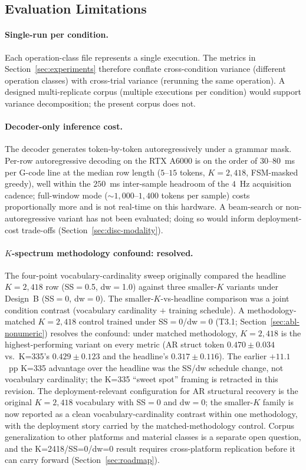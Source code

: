 \documentclass[sensors,article,submit,moreauthors,pdftex]{Definitions/mdpi}
\begin{document}
\subsection{Evaluation Limitations}
\label{sec:lim-eval}

\paragraph{Single-run per condition.} Each operation-class file represents a single execution. The metrics in Section~\ref{sec:experiments} therefore conflate cross-condition variance (different operation classes) with cross-trial variance (rerunning the same operation). A designed multi-replicate corpus (multiple executions per condition) would support variance decomposition; the present corpus does not.

\paragraph{Decoder-only inference cost.} The decoder generates token-by-token autoregressively under a grammar mask. Per-row autoregressive decoding on the RTX A6000 is on the order of $30$--$80$~ms per G-code line at the median row length ($5$--$15$ tokens, $K\!=\!2{,}418$, FSM-masked greedy), well within the $250$~ms inter-sample headroom of the $4$~Hz acquisition cadence; full-window mode ($\sim$$1{,}000$--$1{,}400$ tokens per sample) costs proportionally more and is not real-time on this hardware. A beam-search or non-autoregressive variant has not been evaluated; doing so would inform deployment-cost trade-offs (Section~\ref{sec:disc-modality}).

\paragraph{$K$-spectrum methodology confound: resolved.} The four-point vocabulary-cardinality sweep originally compared the headline $K\!=\!2{,}418$ row (SS$=$0.5, dw$=$1.0) against three smaller-$K$ variants under Design~B (SS$=$0, dw$=$0). The smaller-$K$-vs-headline comparison was a joint condition contrast (vocabulary cardinality $+$ training schedule). A methodology-matched $K\!=\!2{,}418$ control trained under SS$=$0/dw$=$0 (T3.1; Section~\ref{sec:abl-nonumeric}) resolves the confound: under matched methodology, $K\!=\!2{,}418$ is the highest-performing variant on every metric (AR struct token $0.470 \pm 0.034$ vs.\ K=335's $0.429 \pm 0.123$ and the headline's $0.317 \pm 0.116$). The earlier $+11.1$~pp K=335 advantage over the headline was the SS/dw schedule change, not vocabulary cardinality; the K=335 ``sweet spot'' framing is retracted in this revision. The deployment-relevant configuration for AR structural recovery is the original $K\!=\!2{,}418$ vocabulary with SS$=$0 and dw$=$0; the smaller-$K$ family is now reported as a clean vocabulary-cardinality contrast within one methodology, with the deployment story carried by the matched-methodology control. Corpus generalization to other platforms and material classes is a separate open question, and the K=2418/SS=0/dw=0 result requires cross-platform replication before it can carry forward (Section~\ref{sec:roadmap}).
\end{document}
